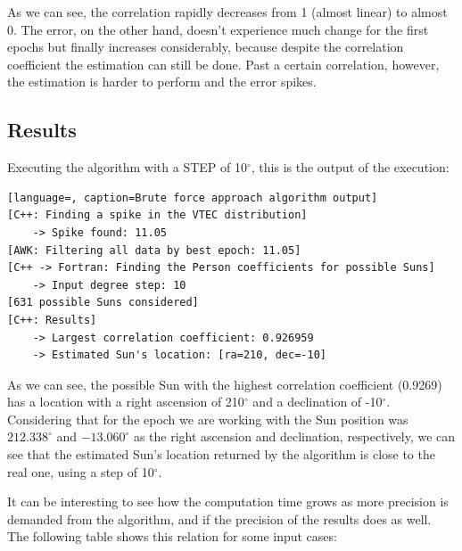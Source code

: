 As we can see, the correlation rapidly decreases from 1 (almost linear) to almost 0. The error, on the other hand, doesn't experience much change for the first epochs but finally increases considerably, because despite the correlation coefficient the estimation can still be done. Past a certain correlation, however, the estimation is harder to perform and the error spikes. 

\subsection{Results}

Executing the algorithm with a STEP of 10$^{\circ}$, this is the output of the execution:

\begin{minipage}{\linewidth}
\begin{lstlisting}[language=, caption=Brute force approach algorithm output]
[C++: Finding a spike in the VTEC distribution]
	-> Spike found: 11.05
[AWK: Filtering all data by best epoch: 11.05]
[C++ -> Fortran: Finding the Person coefficients for possible Suns]
	-> Input degree step: 10
[631 possible Suns considered]
[C++: Results]
	-> Largest correlation coefficient: 0.926959
	-> Estimated Sun's location: [ra=210, dec=-10]
\end{lstlisting}
\end{minipage}

As we can see, the possible Sun with the highest correlation coefficient (0.9269) has a location with a right ascension of 210$^{\circ}$ and a declination of -10$^{\circ}$. Considering that for the epoch we are working with the Sun position was $212.338^{\circ}$ and $-13.060^{\circ}$ as the right ascension and declination, respectively, we can see that the estimated Sun's location returned by the algorithm is close to the real one, using a step of 10$^{\circ}$.

It can be interesting to see how the computation time grows as more precision is demanded from the algorithm, and if the precision of the results does as well. The following table shows this relation for some input cases:

